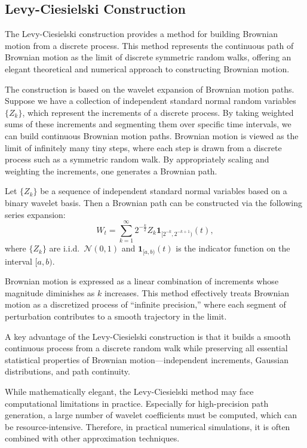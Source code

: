 \documentclass{article}
\begin{document}
\subsection{Levy-Ciesielski Construction}

The Levy-Ciesielski construction provides a method for building Brownian motion from a discrete process. This method represents the continuous path of Brownian motion as the limit of discrete symmetric random walks, offering an elegant theoretical and numerical approach to constructing Brownian motion.

The construction is based on the wavelet expansion of Brownian motion paths. Suppose we have a collection of independent standard normal random variables $\{Z_k\}$, which represent the increments of a discrete process. By taking weighted sums of these increments and segmenting them over specific time intervals, we can build continuous Brownian motion paths. Brownian motion is viewed as the limit of infinitely many tiny steps, where each step is drawn from a discrete process such as a symmetric random walk. By appropriately scaling and weighting the increments, one generates a Brownian path.

Let $\{Z_k\}$ be a sequence of independent standard normal variables based on a binary wavelet basis. Then a Brownian path can be constructed via the following series expansion:
\[
W_t = \sum_{k=1}^{\infty} 2^{-\frac{k}{2}} Z_k \mathbf{1}_{[2^{-k}, 2^{-k+1})}(t),
\]
where $\{Z_k\}$ are i.i.d.\ $\mathcal{N}(0,1)$ and $\mathbf{1}_{[a,b)}(t)$ is the indicator function on the interval $[a, b)$.

Brownian motion is expressed as a linear combination of increments whose magnitude diminishes as $k$ increases. This method effectively treats Brownian motion as a discretized process of “infinite precision,” where each segment of perturbation contributes to a smooth trajectory in the limit.

A key advantage of the Levy-Ciesielski construction is that it builds a smooth continuous process from a discrete random walk while preserving all essential statistical properties of Brownian motion—independent increments, Gaussian distributions, and path continuity.

While mathematically elegant, the Levy-Ciesielski method may face computational limitations in practice. Especially for high-precision path generation, a large number of wavelet coefficients must be computed, which can be resource-intensive. Therefore, in practical numerical simulations, it is often combined with other approximation techniques.
\end{document}
